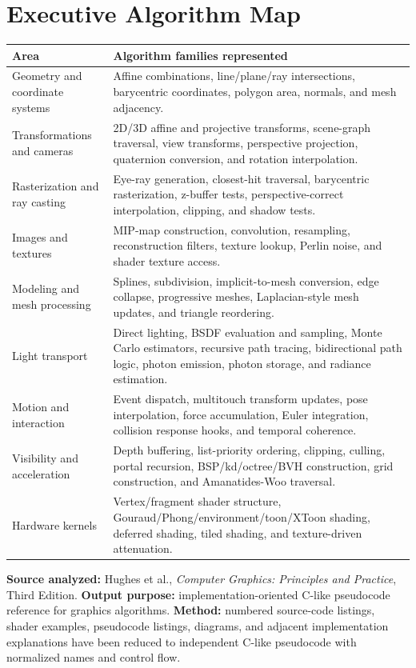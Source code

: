 \documentclass[10pt,letterpaper]{article}
\begin{document}
\section*{Executive Algorithm Map}
\begin{longtable}{L{0.28\textwidth}L{0.66\textwidth}}
\toprule
\textbf{Area} & \textbf{Algorithm families represented}\\
\midrule
Geometry and coordinate systems & Affine combinations, line/plane/ray intersections, barycentric coordinates, polygon area, normals, and mesh adjacency.\\
Transformations and cameras & 2D/3D affine and projective transforms, scene-graph traversal, view transforms, perspective projection, quaternion conversion, and rotation interpolation.\\
Rasterization and ray casting & Eye-ray generation, closest-hit traversal, barycentric rasterization, z-buffer tests, perspective-correct interpolation, clipping, and shadow tests.\\
Images and textures & MIP-map construction, convolution, resampling, reconstruction filters, texture lookup, Perlin noise, and shader texture access.\\
Modeling and mesh processing & Splines, subdivision, implicit-to-mesh conversion, edge collapse, progressive meshes, Laplacian-style mesh updates, and triangle reordering.\\
Light transport & Direct lighting, BSDF evaluation and sampling, Monte Carlo estimators, recursive path tracing, bidirectional path logic, photon emission, photon storage, and radiance estimation.\\
Motion and interaction & Event dispatch, multitouch transform updates, pose interpolation, force accumulation, Euler integration, collision response hooks, and temporal coherence.\\
Visibility and acceleration & Depth buffering, list-priority ordering, clipping, culling, portal recursion, BSP/kd/octree/BVH construction, grid construction, and Amanatides-Woo traversal.\\
Hardware kernels & Vertex/fragment shader structure, Gouraud/Phong/environment/toon/XToon shading, deferred shading, tiled shading, and texture-driven attenuation.\\
\bottomrule
\end{longtable}

\textbf{Source analyzed:} Hughes et al., \emph{Computer Graphics: Principles and Practice}, Third Edition. \textbf{Output purpose:} implementation-oriented C-like pseudocode reference for graphics algorithms. \textbf{Method:} numbered source-code listings, shader examples, pseudocode listings, diagrams, and adjacent implementation explanations have been reduced to independent C-like pseudocode with normalized names and control flow.
\end{document}
